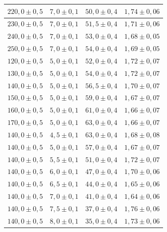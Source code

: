 \documentclass[12pt,a4paper,titlepage,headinclude,bibtotoc]{scrartcl}
\numberwithin{equation}{section}
\begin{document}
\begin{table}[h!]
\begin{tabular}{|c|c|c|c|}
		 $220,0 \pm 0,5$ & $7,0 \pm 0,1$& $50,0 \pm 0,4$ & $1,74 \pm 0,06$\\
		 \hline                         
		 $230,0 \pm 0,5$ & $7,0 \pm 0,1$& $51,5 \pm 0,4$ & $1,71 \pm 0,06$\\
		 \hline                         
		 $240,0 \pm 0,5$ & $7,0 \pm 0,1$& $53,0 \pm 0,4$ & $1,68 \pm 0,05$\\
		 \hline                         
		 $250,0 \pm 0,5$ & $7,0 \pm 0,1$& $54,0 \pm 0,4$ & $1,69 \pm 0,05$\\
		 \hline                         
		 $120,0 \pm 0,5$ & $5,0 \pm 0,1$& $52,0 \pm 0,4$ & $1,72 \pm 0,07$\\
		 \hline                         
		 $130,0 \pm 0,5$ & $5,0 \pm 0,1$& $54,0 \pm 0,4$ & $1,72 \pm 0,07$\\
		 \hline                         
		 $140,0 \pm 0,5$ & $5,0 \pm 0,1$& $56,5 \pm 0,4$ & $1,70 \pm 0,07$\\
		 \hline                         
		 $150,0 \pm 0,5$ & $5,0 \pm 0,1$& $59,0 \pm 0,4$ & $1,67 \pm 0,07$\\
		 \hline                         
		 $160,0 \pm 0,5$ & $5,0 \pm 0,1$& $61,0 \pm 0,4$ & $1,66 \pm 0,07$\\
		 \hline                         
		 $170,0 \pm 0,5$ & $5,0 \pm 0,1$& $63,0 \pm 0,4$ & $1,66 \pm 0,07$\\
		 \hline                         
		 $140,0 \pm 0,5$ & $4,5 \pm 0,1$& $63,0 \pm 0,4$ & $1,68 \pm 0,08$\\
		 \hline                         
		 $140,0 \pm 0,5$ & $5,0 \pm 0,1$& $57,0 \pm 0,4$ & $1,67 \pm 0,07$\\
		 \hline                         
		 $140,0 \pm 0,5$ & $5,5 \pm 0,1$& $51,0 \pm 0,4$ & $1,72 \pm 0,07$\\
		 \hline                         
		 $140,0 \pm 0,5$ & $6,0 \pm 0,1$& $47,0 \pm 0,4$ & $1,70 \pm 0,06$\\
		 \hline                         
		 $140,0 \pm 0,5$ & $6,5 \pm 0,1$& $44,0 \pm 0,4$ & $1,65 \pm 0,06$\\
		 \hline                         
		 $140,0 \pm 0,5$ & $7,0 \pm 0,1$& $41,0 \pm 0,4$ & $1,64 \pm 0,06$\\
		 \hline                         
		 $140,0 \pm 0,5$ & $7,5 \pm 0,1$& $37,0 \pm 0,4$ & $1,76 \pm 0,06$\\
		 \hline                         
		 $140,0 \pm 0,5$ & $8,0 \pm 0,1$& $35,0 \pm 0,4$ & $1,73 \pm 0,06$\\
		 \hline                         

\end{tabular}
\end{table}
\end{document}
